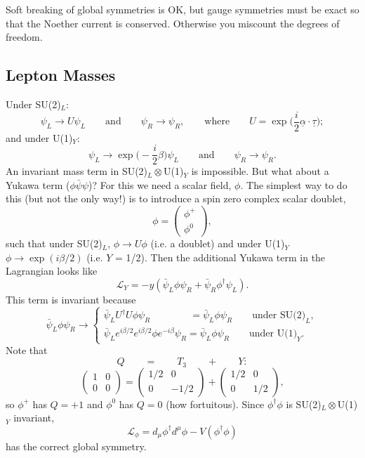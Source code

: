 \documentclass[a4paper,12pt]{article}
\begin{document}
Soft breaking of global symmetries is OK, but gauge symmetries must be exact so that the Noether current is conserved. Otherwise you miscount the degrees of freedom.
%
\subsection{Lepton Masses}
%
Under SU(2)$_L$:
\begin{equation}
\psi_L \to U \psi_L \qquad \text{and} \qquad \psi_R \to \psi_R, \qquad \text{where} \qquad U=\exp\bigg(\frac{i}{2}\underline{\alpha}\cdot\underline{\tau}\bigg);
\end{equation}
and under U(1)$_Y$:
\begin{equation}
\psi_L \to \exp\bigg(-\frac{i}{2}\beta\bigg) \psi_L \qquad \text{and} \qquad \psi_R \to \psi_R.
\end{equation}
An invariant mass term in SU(2)$_L \otimes$U(1)$_Y$ is impossible. But what about a Yukawa term ($\phi \bar{\psi} \psi$)? For this we need a scalar field, $\phi$. The simplest way to do this (but not the only way!) is to introduce a spin zero complex scalar doublet,
\[\phi = \left( \begin{array}{cc}
\phi^+ \\
\phi^0
\end{array} \right), \]
such that under SU(2)$_L$, $\phi \to U \phi$ (i.e. a doublet) and under U(1)$_Y$ $\phi \to \exp(i \beta /2)$ (i.e. $Y$ = 1/2). Then the additional Yukawa term in the Lagrangian looks like
\begin{equation}
\mathcal{L}_Y = -y(\bar{\psi}_L \phi \psi_R + \bar{\psi}_R \phi^\dagger \psi_L).
\end{equation}
This term is invariant because 
\begin{equation}
\bar{\psi}_L \phi \psi_R \to
\begin{cases}
\bar{\psi}_L U^\dagger U \phi \psi_R \qquad \qquad= \bar{\psi}_L \phi \psi_R \qquad \text{under SU(2)}_L,\\
\bar{\psi}_L e^{i \beta/2} e^{i \beta/2} \phi e^{-i\beta} \psi_R =\bar{\psi}_L \phi \psi_R \qquad \text{under U(1)}_Y.
\end{cases}
\end{equation}
Note that
\[ Q \qquad = \qquad T_3 \qquad + \qquad Y: \]
\[\left( \begin{array}{cc}
1 & 0  \\
0 & 0  \end{array} \right)=
\left( \begin{array}{cc}
1/2 & 0  \\
0 & -1/2  \end{array} \right) +
\left( \begin{array}{cc}
1/2 & 0  \\
0 & 1/2  \end{array} \right), \]
so $\phi^+$ has $Q = +1$ and $\phi^0$ has $Q=0$ (how fortuitous). Since $\phi^\dagger \phi$ is SU(2)$_L \otimes$U(1)$_Y$ invariant,
\begin{equation}
\mathcal{L}_\phi = d_\mu \phi^\dagger d^\mu \phi - V(\phi^\dagger \phi)
\end{equation}
has the correct global symmetry.
\end{document}

